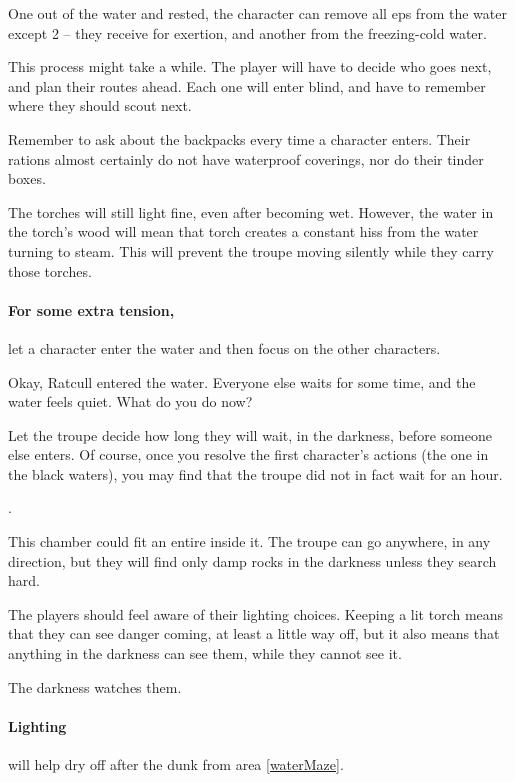 \begin{multicols}{2}
One out of the water and rested, the character can remove all \glspl{ep} from the water except 2 -- they receive  for exertion, and another from the freezing-cold water.

This process might take a while.
The player will have to decide who goes next, and plan their routes ahead.
Each one will enter blind, and have to remember where they should scout next.

Remember to ask about the backpacks every time a character enters.
Their rations almost certainly do not have waterproof coverings, nor do their tinder boxes.

The torches will still light fine, even after becoming wet.
However, the water in the torch's wood will mean that torch creates a constant hiss from the water turning to steam.
This will prevent the troupe moving silently while they carry those torches.

\paragraph{For some extra tension,}
let a character enter the water and then focus on the other characters.

\begin{speechtext}
  Okay, Ratcull entered the water.
  Everyone else waits for some time, and the water feels quiet.
  What do you do now?
\end{speechtext}

Let the troupe decide how long they will wait, in the darkness, before someone else enters.
Of course, once you resolve the first character's actions (the one in the black waters), you may find that the troupe did not in fact wait for an hour.

.


This chamber could fit an entire  inside it.
The troupe can go anywhere, in any direction, but they will find only damp rocks in the darkness unless they search hard.

The players should feel aware of their lighting choices.
Keeping a lit torch means that they can see danger coming, at least a little way off, but it also means that anything in the darkness can see them, while they cannot see it.

The darkness watches them.

\paragraph{Lighting }
will help dry off after the dunk from area \ref{waterMaze}.


\end{multicols}
